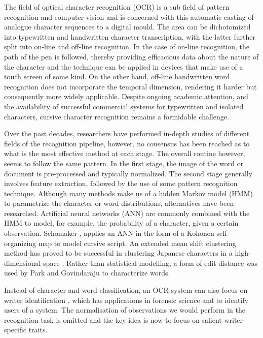 \documentclass[conference]{IEEEtran}
\begin{document}
The field of optical character recognition (OCR) is a sub field of pattern recognition and computer vision and is concerned with this automatic casting of analogue character sequences to a digital mould. The area can be dichotomized into typewritten and handwritten character transcription, with the latter further split into on-line and off-line recognition. In the case of on-line recognition, the path of the pen is followed, thereby providing efficacious data about the nature of the character and the technique can be applied in devices that make use of a touch screen of some kind. On the other hand, off-line handwritten word recognition does not incorporate the temporal dimension, rendering it harder but consequently more widely applicable. Despite ongoing academic attention, and the availability of successful commercial systems for typewritten and isolated characters, cursive character recognition remains a formidable challenge. 

Over the past decades, researchers have performed in-depth studies of different fields of the recognition pipeline, however, no consensus has been reached as to what is the most effective method at each stage. The overall routine however, seems to follow the same pattern. In the first stage, the image of the word or document is pre-processed and typically normalized. The second stage generally involves feature extraction, followed by the use of some pattern recognition technique. Although many methods make us of a hidden Markov model (HMM) \cite{journals/ijprai/MartiB01,journals/pr/BunkeRS95} to parametrize the character or word distributions, alternatives have been researched. Artificial neural networks (ANN) are commonly combined with the HMM \cite{journals/pami/GravesLFBBS09} to model, for example, the probability of a character, given a certain observation. Schomaker \cite{bb105728}, applies an ANN in the form of a Kohonen self-organizing map to model cursive script. An extended mean shift clustering method has proved to be successful in clustering Japanese characters in a high-dimensional space \cite{bb105468}. Rather than statistical modelling, a form of edit distance was used by Park and Govindaraju \cite{CVPR00_VOLII*290} to characterize words.

Instead of character and word classification, an OCR system can also focus on writer identification \cite{bb106176, oai:oai.columbia.edu:epic/nsdl/1/145780}, which has applications in forensic science and to identify users of a system. The normalisation of observations we would perform in the recognition task is omitted and the key idea is now to focus on salient writer-specific traits.
\end{document}
